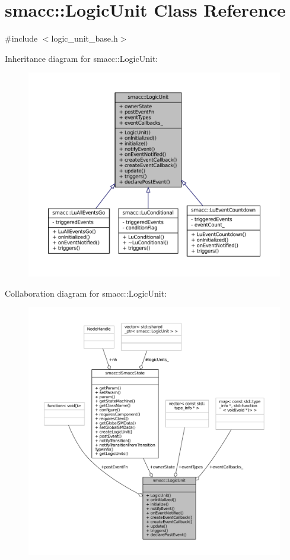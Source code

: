 \hypertarget{classsmacc_1_1LogicUnit}{}\section{smacc\+:\+:Logic\+Unit Class Reference}
\label{classsmacc_1_1LogicUnit}


{\ttfamily \#include $<$logic\+\_\+unit\+\_\+base.\+h$>$}



Inheritance diagram for smacc\+:\+:Logic\+Unit\+:
\nopagebreak
\begin{figure}[H]
\begin{center}
\leavevmode
\includegraphics[width=350pt]{classsmacc_1_1LogicUnit__inherit__graph}
\end{center}
\end{figure}


Collaboration diagram for smacc\+:\+:Logic\+Unit\+:
\nopagebreak
\begin{figure}[H]
\begin{center}
\leavevmode
\includegraphics[width=350pt]{classsmacc_1_1LogicUnit__coll__graph}
\end{center}
\end{figure}
